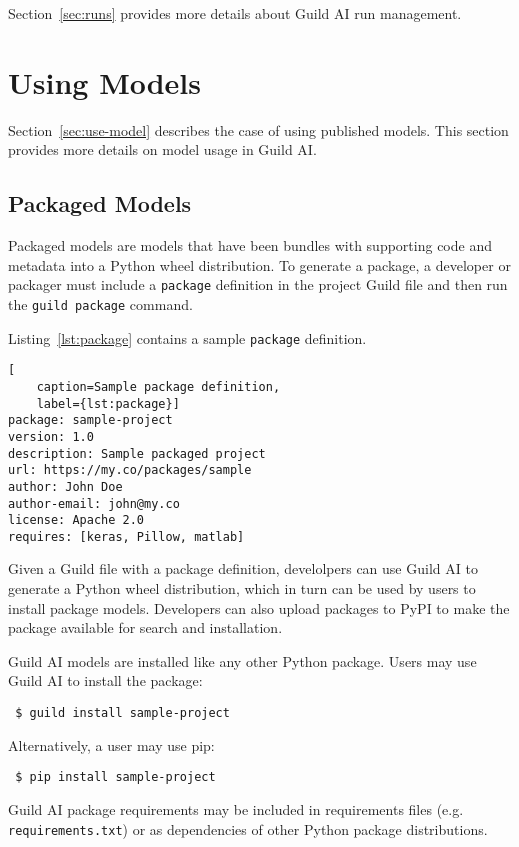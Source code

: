 \documentclass{article}
\begin{document}
Section~\ref{sec:runs} provides more details about Guild AI run
management.

\section{Using Models}

Section~\ref{sec:use-model} describes the case of using published
models. This section provides more details on model usage in Guild AI.

\subsection{Packaged Models}

Packaged models are models that have been bundles with supporting code
and metadata into a Python wheel distribution. To generate a package,
a developer or packager must include a \verb|package| definition in
the project Guild file and then run the \verb|guild package| command.

Listing~\ref{lst:package} contains a sample \verb|package| definition.

\begin{lstlisting}[
    caption=Sample package definition,
    label={lst:package}]
package: sample-project
version: 1.0
description: Sample packaged project
url: https://my.co/packages/sample
author: John Doe
author-email: john@my.co
license: Apache 2.0
requires: [keras, Pillow, matlab]
\end{lstlisting}

Given a Guild file with a package definition, develolpers can use
Guild AI to generate a Python wheel distribution, which in turn can be
used by users to install package models. Developers can also upload
packages to PyPI to make the package available for search and
installation.

Guild AI models are installed like any other Python package. Users may
use Guild AI to install the package:

{\footnotesize
\begin{verbatim}
 $ guild install sample-project
\end{verbatim}}

Alternatively, a user may use pip:

{\footnotesize
\begin{verbatim}
 $ pip install sample-project
\end{verbatim}}

Guild AI package requirements may be included in requirements files
(e.g. \verb|requirements.txt|) or as dependencies of other Python
package distributions.
\end{document}
